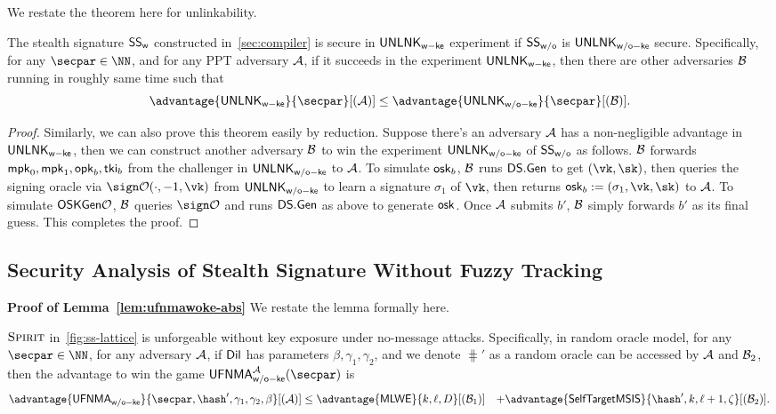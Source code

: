We restate the theorem here for unlinkability.
\begin{theorem}
\label{thm:compiler-unlink}
The stealth signature $\mathsf{SS}_\mathsf{w}$ constructed in~\cref{sec:compiler} is secure in $\mathsf{UNLNK}_\mathsf{w-ke}$ experiment if $\mathsf{SS}_\mathsf{w/o}$ is $\mathsf{UNLNK}_\mathsf{w/o-ke}$ secure.
Specifically, for any $\secpar\in\NN$, and for any PPT adversary $\mathcal{A}$, if it succeeds in the experiment $\mathsf{UNLNK}_\mathsf{w-ke}$, then there are other adversaries $\mathcal{B}$ running in roughly same time such that$$
\advantage{\unlinkwke}{\secpar}[(\Ac)] \le \advantage{\unlinkwoke}{\secpar}[(\Bc)].
$$
\end{theorem}
\begin{proof}
Similarly, we can also prove this theorem easily by reduction. Suppose there's an adversary $\mathcal{A}$ has a non-negligible advantage in $\mathsf{UNLNK}_\mathsf{w-ke}$, then we can construct another adversary $\mathcal{B}$ to win the experiment $\mathsf{UNLNK}_\mathsf{w/o-ke}$ of $\mathsf{SS}_\mathsf{w/o}$ as follows. $\mathcal{B}$ forwards $\mathsf{mpk}_0,\mathsf{mpk}_1,\mathsf{opk}_b,\mathsf{tki}_b$ from the challenger in $\mathsf{UNLNK}_\mathsf{w/o-ke}$ to $\mathcal{A}$. To simulate $\mathsf{osk}_b$, $\mathcal{B}$ runs $\mathsf{DS}.\mathsf{Gen}$ to get $(\vk,\sk)$, then queries the signing oracle via $\sign\Oc(\cdot, -1, \vk)$ from $\mathsf{UNLNK}_\mathsf{w/o-ke}$ to learn a signature $\sigma_1$ of $\vk$, then returns $\osk_b:=(\sigma_1,\vk,\sk)$ to $\mathcal{A}$.
To simulate $\mathsf{OSKGen}\mathcal{O}$, $\mathcal{B}$ queries $\sign\Oc$ and runs $\mathsf{DS}.\mathsf{Gen}$ as above to generate $\mathsf{osk}$. Once $\mathcal{A}$ submits $b'$, $\mathcal{B}$ simply forwards $b'$ as its final guess. This completes the proof.

\end{proof}


\subsection{Security Analysis of Stealth Signature Without Fuzzy Tracking}\label{sec:security_spirit}

\noindent\textbf{Proof of Lemma~\ref{lem:ufnmawoke-abs}}
We restate the lemma formally here.

\begin{lemma}
\label{lem:ufnmawoke}
$\textsc{Spirit}$ in~\cref{fig:ss-lattice} is unforgeable without key exposure under no-message attacks. Specifically, in random oracle model, for any $\secpar\in\NN$, for any adversary $\mathcal{A}$, if $\mathsf{Dil}$ has parameters $\beta,\gamma_1,\gamma_2$, and we denote $\hash'$ as a random oracle can be accessed by $\mathcal{A}$ and $\mathcal{B}_2$, then the advantage to win the game $\ufnmawoke^\Ac(\secpar)$ is
\begin{align*}
    \advantage{\ufnmawoke}{\secpar,\hash',\gamma_1,\gamma_2,\beta}[(\Ac)] & \le 
    \advantage{\mlwe}{k,\ell,D}[(\Bc_1)] & + \advantage{\selfmsis}{\hash',k,\ell+1,\zeta}[(\Bc_2)].
\end{align*}
\end{lemma}

